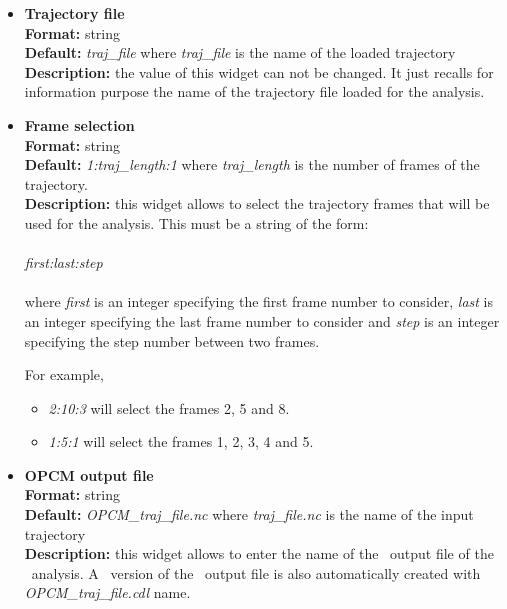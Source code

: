 \documentclass[a4paper,11pt]{report}
\begin{document}
\begin{itemize}
\item \textbf{Trajectory file}\\
\textbf{Format:} string\\
\textbf{Default:} \textit{traj\_file} where \textit{traj\_file} is the name of the loaded trajectory\\
\textbf{Description:} the value of this widget can not be changed. It just recalls for information purpose the name
of the trajectory file loaded for the analysis.

\item \textbf{Frame selection}\\
\textbf{Format:} string\\
\textbf{Default:} \textit{1:traj\_length:1} where \textit{traj\_length} is the number of frames of the trajectory.\\
\textbf{Description:} this widget allows to select the trajectory frames that will be used for the analysis. This must
be a string of the form:
\\\\
\textit{first:last:step}
\\\\
where \textit{first} is an integer specifying the first frame number to consider, \textit{last} is an integer specifying the last 
frame number to consider and \textit{step} is an integer specifying the step number between two frames.

For example,
\begin{itemize}
\item \textit{2:10:3} will select the frames 2, 5 and 8.
\item \textit{1:5:1} will select the frames 1, 2, 3, 4 and 5.
\end{itemize}

\item \textbf{OPCM output file}\\
\textbf{Format:} string\\
\textbf{Default:} \textit{OPCM\_traj\_file.nc} where \textit{traj\_file.nc} is the name of the input trajectory\\
\textbf{Description:} this widget allows to enter the name of the \NetCDF\ output file of the \OPCM\ analysis. A \CDL\ 
version of the \NetCDF\ output file is also automatically created with \textit{OPCM\_traj\_file.cdl} name.
\end{itemize}
\end{document}

